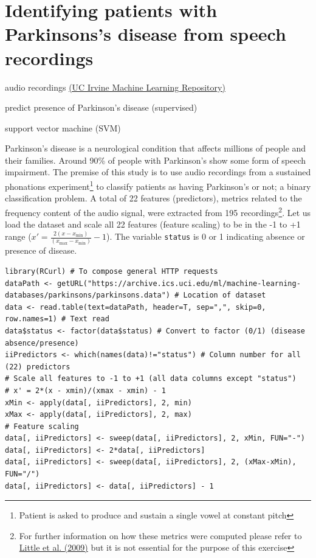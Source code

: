\documentclass[a4paper,11pt]{article}
\begin{document}
\section{Identifying patients with Parkinsons's disease from speech recordings}
\begin{framed}
\begin{description}[leftmargin=5em,style=nextline]\addtolength{\itemsep}{-0.2\baselineskip}
	\item[Data:] audio recordings \href{https://archive.ics.uci.edu/ml/datasets/Parkinsons}{(UC Irvine Machine Learning Repository)}	
	\item[Task:] predict presence of Parkinson's disease (supervised)
	\item[Method:] support vector machine (SVM)
\end{description} 
\end{framed}

Parkinson's disease is a neurological condition that affects millions of people and their families. Around 90\% of 
people with Parkinson's show some form of speech impairment. The premise of this study is to use audio recordings
from a sustained phonations experiment\footnote{Patient is asked to produce and sustain a single vowel at constant pitch}
to classify patients as having Parkinson's or not; a binary classification problem. A total of 22 features (predictors), metrics
related to the frequency content of the audio signal, were extracted from 195 recordings\footnote{For further information on how these 
metrics were computed please refer to \href{http://www.ncbi.nlm.nih.gov/pmc/articles/PMC3051371/}{Little et al. (2009)} but it is not essential for the purpose of this exercise}.
Let us load the dataset and scale all 22 features (feature scaling) to be in the -1 to +1 range ($x' = \frac{2(x - x_{\mathrm{min}})}{(x_{\mathrm{max}}-x_{\mathrm{min}})}-1$). 
The variable \texttt{status} is 0 or 1 indicating absence or presence of disease. 
\\
\begin{lstlisting}[style=RCode]
library(RCurl) # To compose general HTTP requests 
dataPath <- getURL("https://archive.ics.uci.edu/ml/machine-learning-databases/parkinsons/parkinsons.data") # Location of dataset
data <- read.table(text=dataPath, header=T, sep=",", skip=0, row.names=1) # Text read
data$status <- factor(data$status) # Convert to factor (0/1) (disease absence/presence)
iiPredictors <- which(names(data)!="status") # Column number for all (22) predictors
# Scale all features to -1 to +1 (all data columns except "status")
# x' = 2*(x - xmin)/(xmax - xmin) - 1
xMin <- apply(data[, iiPredictors], 2, min)
xMax <- apply(data[, iiPredictors], 2, max)
# Feature scaling
data[, iiPredictors] <- sweep(data[, iiPredictors], 2, xMin, FUN="-")
data[, iiPredictors] <- 2*data[, iiPredictors]
data[, iiPredictors] <- sweep(data[, iiPredictors], 2, (xMax-xMin), FUN="/")
data[, iiPredictors] <- data[, iiPredictors] - 1
\end{lstlisting}
\end{document}
